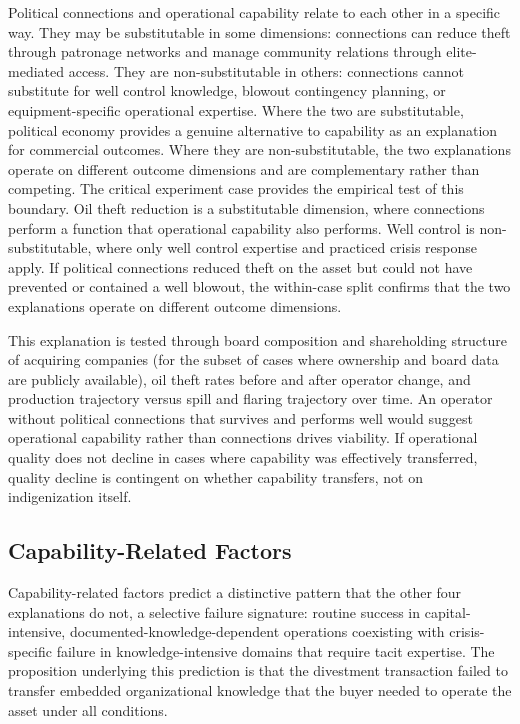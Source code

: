 Political connections and operational capability relate to each other in
a specific way. They may be substitutable in some dimensions:
connections can reduce theft through patronage networks and manage
community relations through elite-mediated access. They are
non-substitutable in others: connections cannot substitute for well
control knowledge, blowout contingency planning, or equipment-specific
operational expertise. Where the two are substitutable, political
economy provides a genuine alternative to capability as an explanation
for commercial outcomes. Where they are non-substitutable, the two
explanations operate on different outcome dimensions and are
complementary rather than competing. The critical experiment case
provides the empirical test of this boundary. Oil theft reduction is a
substitutable dimension, where connections perform a function that
operational capability also performs. Well control is non-substitutable,
where only well control expertise and practiced crisis response apply.
If political connections reduced theft on the asset but could not have
prevented or contained a well blowout, the within-case split confirms
that the two explanations operate on different outcome dimensions.

This explanation is tested through board composition and shareholding
structure of acquiring companies (for the subset of cases where
ownership and board data are publicly available), oil theft rates before
and after operator change, and production trajectory versus spill and
flaring trajectory over time. An operator without political connections
that survives and performs well would suggest operational capability
rather than connections drives viability. If operational quality does
not decline in cases where capability was effectively transferred,
quality decline is contingent on whether capability transfers, not on
indigenization itself.

\hypertarget{capability-related-factors}{%
\subsection{Capability-Related
Factors}\label{capability-related-factors}}

Capability-related factors predict a distinctive pattern that the other
four explanations do not, a selective failure signature: routine success
in capital-intensive, documented-knowledge-dependent operations
coexisting with crisis-specific failure in knowledge-intensive domains
that require tacit expertise. The proposition underlying this prediction
is that the divestment transaction failed to transfer embedded
organizational knowledge that the buyer needed to operate the asset
under all conditions.

